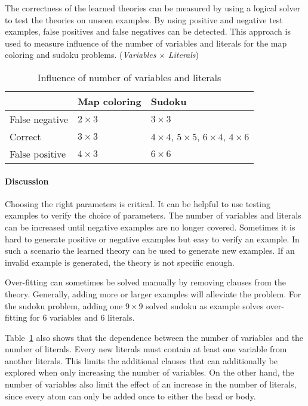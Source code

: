 \begin{experiment}
	\label{exp:cd_acc_influence_par}
	The correctness of the learned theories can be measured by using a logical solver to test the theories on unseen examples.
	By using positive and negative test examples, false positives and false negatives can be detected.
	This approach is used to measure influence of the number of variables and literals for the map coloring and sudoku problems.
	(\emph{Variables} $\times$ \emph{Literals})

	\begin{table}[!htp]
		\begin{tabularx}{\textwidth}{l|ll}
			 & \textbf{Map coloring}		& \textbf{Sudoku} \\
			\toprule
			False negative 	& $2 \times 3$				& $3 \times 3$ \\
			Correct 		& $3 \times 3$				& $4 \times 4$, $5 \times 5$, $6 \times 4$, $4 \times 6$ \\
			False positive 	& $4 \times 3$				& $6 \times 6$	\\
		\end{tabularx}
		\caption{Influence of number of variables and literals}
		\label{tbl:cd_acc_influence}
	\end{table}

\end{experiment}

\paragraph{Discussion}
	Choosing the right parameters is critical.
	It can be helpful to use testing examples to verify the choice of parameters.
	The number of variables and literals can be increased until negative examples are no longer covered.
	Sometimes it is hard to generate positive or negative examples but easy to verify an example.
	In such a scenario the learned theory can be used to generate new examples.
	If an invalid example is generated, the theory is not specific enough.

	Over-fitting can sometimes be solved manually by removing clauses from the theory.
	Generally, adding more or larger examples will alleviate the problem.
	For the sudoku problem, adding one $9 \times 9$ solved sudoku as example solves over-fitting for $6$ variables and $6$ literals.

	Table~\ref{tbl:cd_acc_influence} also shows that the dependence between the number of variables and the number of literals.
	Every new literals must contain at least one variable from another literals.
	This limits the additional clauses that can additionally be explored when only increasing the number of variables.
	On the other hand, the number of variables also limit the effect of an increase in the number of literals, since every atom can only be added once to either the head or body.

